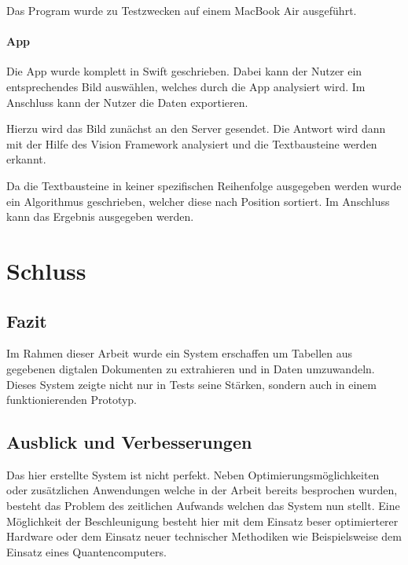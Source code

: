 \documentclass[
]{article}
\begin{document}
Das Program wurde zu Testzwecken auf einem MacBook Air ausgeführt.

\hypertarget{header-n216}{%
\paragraph{App}\label{header-n216}}

Die App wurde komplett in Swift geschrieben. Dabei kann der Nutzer ein
entsprechendes Bild auswählen, welches durch die App analysiert wird. Im
Anschluss kann der Nutzer die Daten exportieren.

Hierzu wird das Bild zunächst an den Server gesendet. Die Antwort wird
dann mit der Hilfe des Vision Framework analysiert und die Textbausteine
werden erkannt.

Da die Textbausteine in keiner spezifischen Reihenfolge ausgegeben
werden wurde ein Algorithmus geschrieben, welcher diese nach Position
sortiert. Im Anschluss kann das Ergebnis ausgegeben werden.

\hypertarget{header-n220}{%
\section{Schluss}\label{header-n220}}

\hypertarget{header-n221}{%
\subsection{Fazit}\label{header-n221}}

Im Rahmen dieser Arbeit wurde ein System erschaffen um Tabellen aus
gegebenen digtalen Dokumenten zu extrahieren und in Daten umzuwandeln.
Dieses System zeigte nicht nur in Tests seine Stärken, sondern auch in
einem funktionierenden Prototyp.

\hypertarget{header-n225}{%
\subsection{Ausblick und Verbesserungen}\label{header-n225}}

Das hier erstellte System ist nicht perfekt. Neben
Optimierungsmöglichkeiten oder zusätzlichen Anwendungen welche in der
Arbeit bereits besprochen wurden, besteht das Problem des zeitlichen
Aufwands welchen das System nun stellt. Eine Möglichkeit der
Beschleunigung besteht hier mit dem Einsatz beser optimierterer Hardware
oder dem Einsatz neuer technischer Methodiken wie Beispielsweise dem
Einsatz eines Quantencomputers.
\end{document}
